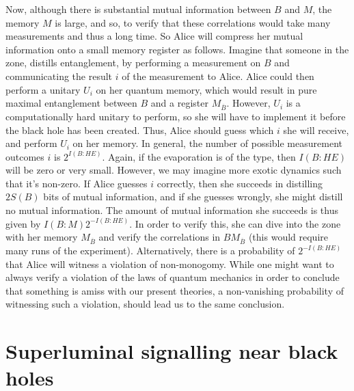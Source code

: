 \documentclass[12pt,a4paper]{article}
\begin{document}
Now, although there is substantial mutual information between $B$ and $M$, the memory $M$ is large, and so, to verify that these correlations would take many measurements and thus a long time. So 
Alice will compress her mutual information onto a small memory register as follows. Imagine that someone in the zone, distills entanglement, by performing a measurement on $B$ and communicating the result $i$ of the measurement to Alice. Alice could then
perform a unitary $U_i$ on her quantum memory, which would result in pure maximal entanglement between $B$ and a register $M_{\overline{B}}$. However, $U_i$ is a computationally hard unitary to perform, so she will have to implement it before the black hole has been created. Thus, Alice should guess which $i$ she will receive, and perform $U_i$ on her memory. In general, the number of possible measurement outcomes $i$ is $2^{I(B:HE)}$\cite{devetak2005distillation}. Again, if the evaporation is of the  \cite{bhlock,HaydenPreskill,sekino2008fast}  type, then $I(B:HE)$ will be zero or very small. However, we may imagine more exotic dynamics such that it's non-zero. If Alice guesses $i$ correctly, then she succeeds in distilling $ 2S(B)$ bits of mutual information, and if she guesses wrongly, she might distill no mutual information. The amount of mutual information she succeeds is thus given by $I(B:M)2^{-I(B:HE)}$. In order to verify this, she can dive into the zone with her memory $M_{\overline{B}}$ and verify the correlations in $BM_{\overline{B}}$ (this would require many runs of the experiment). Alternatively, there is a 
probability of $2^{-I(B:HE)}$ that Alice will witness a violation of non-monogomy. While one might want to always verify  a violation of the laws of quantum mechanics 
in order to conclude that
something is amiss with our present theories, a non-vanishing probability of witnessing such a violation, should lead us to the same conclusion.
 
\section{Superluminal signalling near black holes}
\label{sec:chsh}
\end{document}
